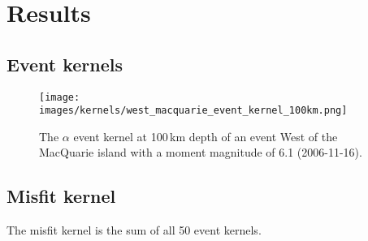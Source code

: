 
\chapter{Results}

\section{Event kernels}

\begin{figure}[h]
\begin{center}
\texttt{[image: images/kernels/west\_macquarie\_event\_kernel\_100km.png]}
\caption{The $\alpha$ event kernel at 100$\,$km depth of an event West of the MacQuarie island with a moment magnitude of 6.1 (2006-11-16).}  
\label{w_macq_kernel}
\end{center}
\end{figure}


\section{Misfit kernel}

The misfit kernel is the sum of all 50 event kernels.